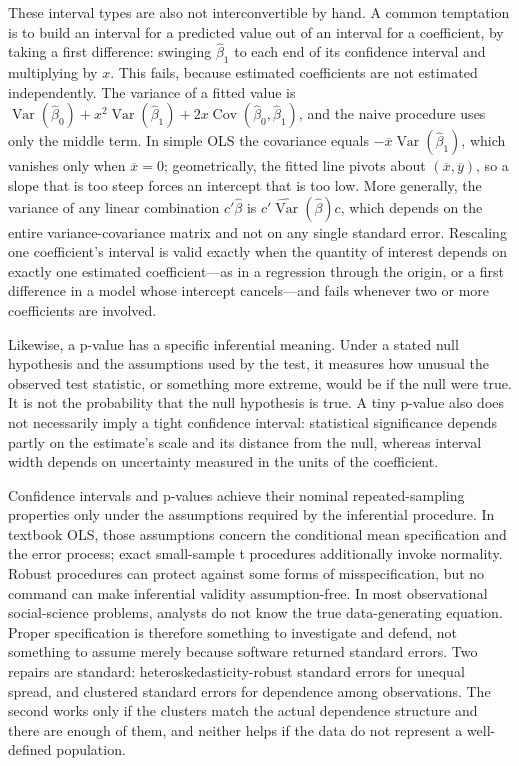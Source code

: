 \documentclass[11pt]{report}
\newcommand{\Var}{\operatorname{Var}}
\begin{document}
These interval types are also not interconvertible by hand. A common temptation is to build an interval for a predicted value out of an interval for a coefficient, by taking a first difference: swinging \(\widehat{\beta}_1\) to each end of its confidence interval and multiplying by \(x\). This fails, because estimated coefficients are not estimated independently. The variance of a fitted value is \(\Var(\widehat{\beta}_0)+x^2\Var(\widehat{\beta}_1)+2x\operatorname{Cov}(\widehat{\beta}_0,\widehat{\beta}_1)\), and the naive procedure uses only the middle term. In simple OLS the covariance equals \(-\overline{x}\Var(\widehat{\beta}_1)\), which vanishes only when \(\overline{x}=0\); geometrically, the fitted line pivots about \((\overline{x},\overline{y})\), so a slope that is too steep forces an intercept that is too low. More generally, the variance of any linear combination \(c'\widehat{\beta}\) is \(c'\widehat{\Var}(\widehat{\beta})c\), which depends on the entire variance-covariance matrix and not on any single standard error. Rescaling one coefficient's interval is valid exactly when the quantity of interest depends on exactly one estimated coefficient---as in a regression through the origin, or a first difference in a model whose intercept cancels---and fails whenever two or more coefficients are involved.

Likewise, a p-value has a specific inferential meaning. Under a stated null hypothesis and the assumptions used by the test, it measures how unusual the observed test statistic, or something more extreme, would be if the null were true. It is not the probability that the null hypothesis is true. A tiny p-value also does not necessarily imply a tight confidence interval: statistical significance depends partly on the estimate's scale and its distance from the null, whereas interval width depends on uncertainty measured in the units of the coefficient.

Confidence intervals and p-values achieve their nominal repeated-sampling properties only under the assumptions required by the inferential procedure. In textbook OLS, those assumptions concern the conditional mean specification and the error process; exact small-sample t procedures additionally invoke normality. Robust procedures can protect against some forms of misspecification, but no command can make inferential validity assumption-free. In most observational social-science problems, analysts do not know the true data-generating equation. Proper specification is therefore something to investigate and defend, not something to assume merely because software returned standard errors. Two repairs are standard: heteroskedasticity-robust standard errors for unequal spread, and clustered standard errors for dependence among observations. The second works only if the clusters match the actual dependence structure and there are enough of them, and neither helps if the data do not represent a well-defined population.
\end{document}
